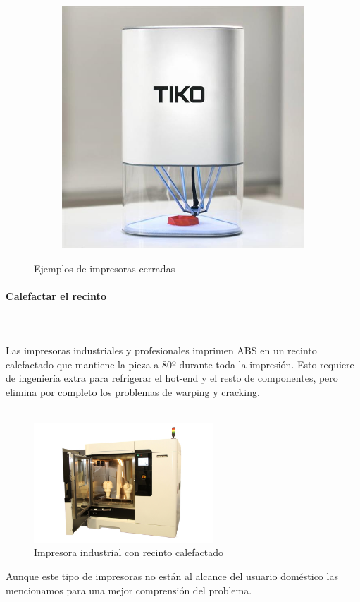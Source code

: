 \documentclass[11pt,a4paper]{article}
\begin{document}
\begin{figure}[H]
\begin{subfigure}[b]{0.3\textwidth}
        \includegraphics[width=\textwidth,cfbox=azul_marcos 4pt 0pt]{FOTOS/IMPRESORACERRADA3}
    \end{subfigure}
    \caption*{Ejemplos de impresoras cerradas}
\end{figure}
			\paragraph{Calefactar el recinto}\mbox{}\\\\
Las impresoras industriales y profesionales imprimen ABS en un recinto calefactado que mantiene la pieza a 80º durante toda la impresión. Esto requiere de ingeniería extra para refrigerar el hot-end y el resto de componentes, pero elimina por completo los problemas de warping y cracking.
\\\\
\begin{figure}[H]
\centering
\includegraphics[width=0.6\textwidth,cfbox=azul_marcos 4pt 0pt]{FOTOS/STRATASYS}
\caption*{Impresora industrial con recinto calefactado}
\end{figure}
Aunque este tipo de impresoras no están al alcance del usuario doméstico las mencionamos para una mejor comprensión del problema.
\end{document}
